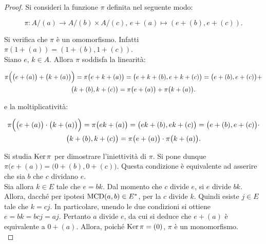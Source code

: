     \begin{proof}
        Si consideri la funzione $\pi$ definita nel seguente
        modo:
        
        \[ \pi : A/(a) \to A/(b) \times A/(c),\,e + (a) \mapsto (e + (b), e + (c)). \]
        
        \vskip 0.1in
        
        Si verifica che $\pi$ è un omomorfismo. Infatti
        $\pi(1 + (a)) = (1 + (b), 1 + (c))$. \\
        
        Siano $e$, $k \in A$. Allora
        $\pi$ soddisfa la linearità:
        
        \begin{multline*}
            \pi\Bigl(\bigl(e + (a)\bigr) + \bigl(k + (a)\bigr)\Bigr) = \pi\bigl(e + k + (a)\bigr) =
            \bigl(e + k + (b), e + k + (c)\bigr) =
            \bigl(e + (b), e + (c)\bigr) + \\ \bigl(k + (b), k + (c)\bigr) = \pi\bigl(e + (a)\bigr) +
            \pi\bigl(k + (a)\bigr).
        \end{multline*}
        
        \vskip 0.1in
        
        e la moltiplicatività:
        
        \begin{multline*}
            \pi\Bigl(\bigl(e + (a)\bigr) \cdot \bigl(k + (a)\bigr)\Bigr) = \pi\bigl(ek + (a)\bigr) =
            \bigl(ek + (b), ek + (c)\bigr) =
            \bigl(e + (b), e + (c)\bigr) \cdot \\ \bigl(k + (b), k + (c)\bigr) = \pi\bigl(e + (a)\bigr) \cdot
            \pi\bigl(k + (a)\bigr).
        \end{multline*}
        
        \vskip 0.1in
        
        Si studia $\operatorname{Ker} \pi$ per dimostrare l'iniettività di $\pi$.
        Si pone dunque $\pi\bigl(e + (a)\bigr) = \bigl(0 + (b), 0 + (c)\bigr)$.
        Questa condizione è equivalente ad asserire che sia $b$ che $c$ dividano
        $e$. \\
        
        Sia allora $k \in E$ tale che $e=bk$. Dal momento che $c$ divide $e$, si
        $e$ divide $bk$. Allora, dacché per ipotesi $\operatorname{MCD}(a, b) \in E^*$, per la
         $c$ divide $k$. Quindi esiste $j \in E$ tale che
        $k=cj$. In particolare, unendo le due condizioni si ottiene
        $e=bk=bcj=aj$. Pertanto $a$ divide $e$, da cui si deduce che $e + (a)$
        è equivalente a $0 + (a)$. Allora, poiché $\operatorname{Ker} \pi = (0)$, $\pi$ è un
        monomorfismo. \\
        

\end{proof}
